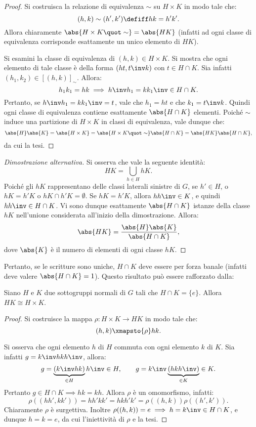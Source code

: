 \documentclass[12pt]{scrartcl}
\begin{document}
	\begin{proof}
		Si costruisca la relazione di equivalenza $\sim$
		su $H \times K$ in modo tale che:
		\[ (h,k) \sim (h',k') \defiff hk=h'k'. \]
		Allora chiaramente $\abs{H \times K \quot \sim} = \abs{HK}$
		(infatti ad ogni classe di equivalenza corrisponde esattamente un unico elemento di $HK$). \bigskip
		
		Si esamini la classe di equivalenza di $(h,k) \in H \times K$. Si
		mostra che ogni elemento di tale classe è della forma
		$(ht,t\inv k)$ con $t \in H \cap K$. Sia infatti $(h_1,k_2) \in
		[(h,k)]_\sim$. Allora:
		\[
			h_1k_1=hk \implies h\inv h_1 = k k_1\inv \in H \cap K.
		\]
		Pertanto, se $h\inv h_1 = k k_1\inv = t$, vale che $h_1=ht$ e che $k_1 = t\inv k$.
		Quindi ogni classe di equivalenza contiene esattamente $\abs{H \cap K}$ elementi.
		Poiché $\sim$ induce una partizione di $H \times K$ in classi
		di equivalenza, vale dunque che:
		\[
			\abs{H} \abs{K} = \abs{H \times K} = \abs{H \times K \quot \sim} \abs{H \cap K} = \abs{HK} \abs{H \cap K},
		\]
		da cui la tesi. 
	\end{proof}
	
	\begin{proof}[Dimostrazione alternativa]
		Si osserva che vale la seguente identità:
		\[ HK = \bigcup_{h \in H} hK. \]
		Poiché gli $hK$ rappresentano delle classi laterali sinistre
		di $G$, se $h' \in H$, o $hK = h'K$ o $hK \cap h'K = \emptyset$. Se $hK = h'K$, allora $h h\inv \in K$, e quindi
		$h h\inv \in H \cap K$. Vi sono dunque esattamente
		$\abs{H \cap K}$ istanze della classe $hK$ nell'unione
		considerata all'inizio della dimostrazione. Allora:
		\[ \abs{HK} = \frac{\abs{H} \abs{K}}{\abs{H \cap K}}, \]
		dove $\abs{K}$ è il numero di elementi di ogni classe
		$hK$.
	\end{proof}

	Pertanto, se le scritture sono uniche, $H \cap K$ deve essere
	per forza banale (infatti deve valere $\abs{H \cap K} = 1$).
	Questo risultato può essere rafforzato dalla:
	
	\begin{proposition}
		Siano $H$ e $K$ due sottogruppi normali di $G$ tali che
		$H \cap K = \{e\}$. Allora $HK \cong H \times K$.
	\end{proposition}

	\begin{proof}
		Si costruisce la mappa $\rho : H \times K \to HK$
		in modo tale che:
		\[ (h,k) \xmapsto{\rho} hk. \]
		
		Si osserva che ogni elemento $h$ di $H$ commuta con
		ogni elemento $k$ di $K$. Sia infatti $g = k\inv hkh\inv$, allora:
		\[
			g = \underbrace{(k\inv hk)}_{\in H} h\inv \in H, \qquad g = k\inv \underbrace{(hkh\inv)}_{\in K} \in K.
		\]
		Pertanto $g \in H \cap K \implies hk=kh$. Allora $\rho$
		è un omomorfismo, infatti:
		\[
			\rho((hh',kk')) = hh'kk' = hkh'k' = \rho((h,k)) \rho((h',k')).
		\]
		Chiaramente $\rho$ è surgettiva. Inoltre $\rho((h,k)) = e \implies h = k\inv \in H \cap K$,
		e dunque $h = k = e$, da cui l'iniettività di $\rho$
		e la tesi.
	\end{proof}
	
\end{document}
